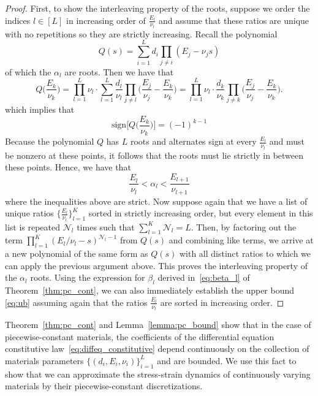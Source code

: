 \documentclass[letterpaper,11pt]{article}
\begin{document}
\begin{proof}
    First, to show the interleaving property of the roots, suppose we order the indices $l \in [L]$ in increasing order of $\frac{E_l}{\nu_l}$ and assume that these ratios are unique with no repetitions so they are strictly increasing. Recall the polynomial
    \begin{equation}
        Q(s) = \sum_{i=1}^Ld_i\prod_{j \neq i}(E_j - \nu_j s)
    \end{equation}
    of which the $\alpha_l$ are roots. Then we have that
    \begin{equation}
        Q\Big(\frac{E_k}{\nu_k}\Big) = \prod_{l=1}^L \nu_l \cdot \sum_{l=1}^L\frac{d_l}{\nu_l}\prod_{j \neq l}\Big(\frac{E_j}{\nu_j} - \frac{E_k}{\nu_k}\Big) = \prod_{l=1}^L \nu_l \cdot \frac{d_k}{\nu_k}\prod_{j \neq k}\Big(\frac{E_j}{\nu_j} - \frac{E_k}{\nu_k}\Big).
    \end{equation}
    which implies that
    \begin{equation}
        \text{sign}\Big[Q\Big(\frac{E_k}{\nu_k}\Big)\Big] = (-1)^{k-1}
    \end{equation}
    Because the polynomial $Q$ has $L$ roots and alternates sign at every $\frac{E_{l}}{\nu_l}$ and must be nonzero at these points, it follows that the roots must lie strictly in between these points. Hence, we have that
    \begin{equation}\label{eq:alpha_discrete}
        \frac{E_l}{\nu_l} < \alpha_l < \frac{E_{l+1}}{\nu_{l+1}}
    \end{equation}
    where the inequalities above are strict. Now suppose again that we have a list of unique ratios $\{\frac{E_l}{\nu_l}\}_{l=1}^K$ sorted in strictly increasing order, but every element in this list is repeated $\mathcal{N}_l$ times such that $\sum_{l=1}^K \mathcal{N}_l = L$. Then, by factoring out the term $\prod_{l=1}^K (E_l/\nu_l - s)^{\mathcal{N}_l-1}$ from $Q(s)$ and combining like terms, we arrive at a new polynomial of the same form as $Q(s)$ with all distinct ratios to which we can apply the previous argument above. This proves the interleaving property of the $\alpha_l$ roots. Using the expression for $\beta_l$ derived in~\eqref{eq:beta_l} of Theorem~\ref{thm:pc_cont}, we can also immediately establish the upper bound
    \eqref{eq:ub} assuming again that the ratios $\frac{E_l}{\nu_l}$ are sorted in increasing order.
\end{proof}

Theorem~\ref{thm:pc_cont} and Lemma~\ref{lemma:pc_bound} show that in the case of piecewise-constant materials, the coefficients of the differential equation constitutive law~\eqref{eq:diffeq_constitutive} depend continuously on the collection of materials parameters $\{(d_i, E_i, \nu_i)\}_{i=1}^L$ and are bounded. We use this fact to show that we can approximate the stress-strain dynamics of continuously varying materials by their piecewise-constant discretizations.
\end{document}
